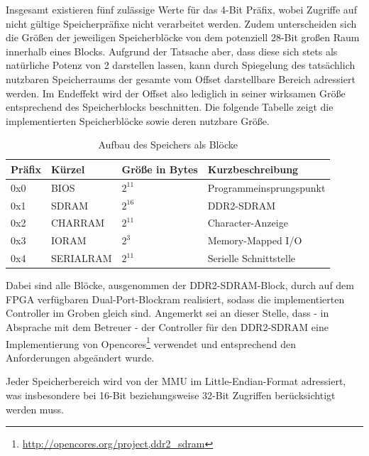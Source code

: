 Insgesamt existieren f\"unf zul\"assige Werte f\"ur das 4-Bit Pr\"afix, wobei Zugriffe auf nicht g\"ultige Speicherpr\"afixe nicht verarbeitet werden. Zudem unterscheiden sich die Gr\"o\ss{}en der jeweiligen Speicherbl\"ocke von dem potenziell 28-Bit gro\ss{}en Raum innerhalb eines Blocks. Aufgrund der Tatsache aber, dass diese sich stets als nat\"urliche Potenz von 2 darstellen lassen, kann durch Spiegelung des tats\"achlich nutzbaren Speicherraums der gesamte vom Offset darstellbare Bereich adressiert werden. Im Endeffekt wird der Offset also lediglich in seiner wirksamen Gr\"o\ss{}e entsprechend des Speicherblocks beschnitten. Die folgende Tabelle zeigt die implementierten Speicherbl\"ocke sowie deren nutzbare Gr\"o\ss{}e.

\begin{table}[H]
	\begin{center}
	\begin{tabular}{| l | l | l | l |}
		\hline
		Pr\"afix & K\"urzel & Gr\"o\ss{}e in Bytes & Kurzbeschreibung \\ \hline
		0x0 & BIOS & $2^{11}$ & Programmeinsprungspunkt \\ \hline
		0x1 & SDRAM & $2^{16}$\footnotemark{} & DDR2-SDRAM \\ \hline
		0x2 & CHARRAM & $2^{11}$ & Character-Anzeige \\ \hline
		0x3 & IORAM & $2^{3}$ & Memory-Mapped I/O \\ \hline
		0x4 & SERIALRAM & $2^{11}$ & Serielle Schnittstelle \\ \hline
	\end{tabular}
	\end{center}
	\label{tab:ramlayout}
	\caption{Aufbau des Speichers als Bl\"ocke}
\end{table}

Dabei sind alle Bl\"ocke, ausgenommen der DDR2-SDRAM-Block, durch auf dem FPGA ver\-f\"ug\-baren Dual-Port-Block\-ram realisiert, sodass die implementierten Controller im Groben gleich sind. Angemerkt sei an dieser Stelle, dass - in Absprache mit dem Betreuer - der Controller f\"ur den DDR2-SDRAM eine Implementierung von Opencores\footnote{\url{http://opencores.org/project,ddr2_sdram}} verwendet und entsprechend den Anforderungen abge\"andert wurde.

Jeder Speicherbereich wird von der MMU im Little-Endian-Format adressiert, was insbesondere bei 16-Bit beziehungsweise 32-Bit Zugriffen ber\"ucksichtigt werden muss.

